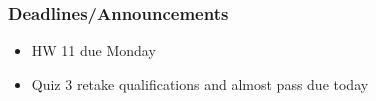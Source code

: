 
\begin{frame}
    \frametitle{Deadlines/Announcements}
\begin{itemize}
            \item HW 11 due Monday
            \item Quiz 3 retake qualifications and almost pass due today
        \end{itemize}
\end{frame}

